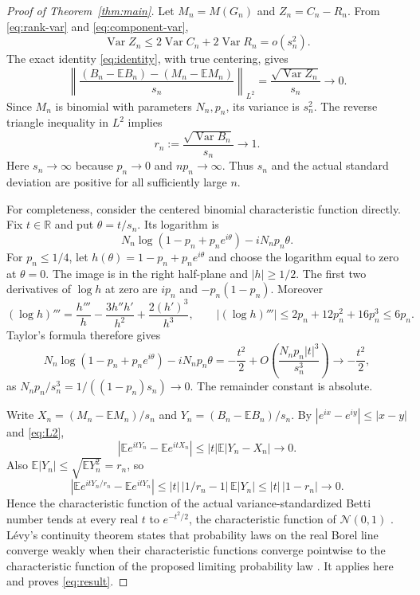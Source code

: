 \documentclass[11pt]{article}
\newcommand{\E}{\mathbb E}
\newcommand{\Var}{\operatorname{Var}}
\begin{document}
\begin{proof}[Proof of Theorem~\ref{thm:main}]
Let $M_n=M(G_n)$ and $Z_n=C_n-R_n$. From \eqref{eq:rank-var} and \eqref{eq:component-var},
\[
 \Var Z_n\le2\Var C_n+2\Var R_n=o(s_n^2).
\]
The exact identity \eqref{eq:identity}, with true centering, gives
\begin{equation}\label{eq:L2}
 \left\|\frac{(B_n-\E B_n)-(M_n-\E M_n)}{s_n}\right\|_{L^2}
 =\frac{\sqrt{\Var Z_n}}{s_n}\longrightarrow0.
\end{equation}
Since $M_n$ is binomial with parameters $N_n,p_n$, its variance is $s_n^2$. The reverse triangle inequality in $L^2$ implies
\begin{equation}\label{eq:variance-ratio}
 r_n:=\frac{\sqrt{\Var B_n}}{s_n}\longrightarrow1.
\end{equation}
Here $s_n\to\infty$ because $p_n\to0$ and $np_n\to\infty$. Thus $s_n$ and the actual standard deviation are positive for all sufficiently large $n$.

For completeness, consider the centered binomial characteristic function directly. Fix $t\in\mathbb R$ and put $\theta=t/s_n$. Its logarithm is
\[
 N_n\log(1-p_n+p_ne^{i\theta})-iN_np_n\theta.
\]
For $p_n\le1/4$, let $h(\theta)=1-p_n+p_ne^{i\theta}$ and choose the logarithm equal to zero at $\theta=0$. The image is in the right half-plane and $|h|\ge1/2$. The first two derivatives of $\log h$ at zero are $ip_n$ and $-p_n(1-p_n)$. Moreover
\[
 (\log h)'''=\frac{h'''}h-\frac{3h''h'}{h^2}+\frac{2(h')^3}{h^3},
 \qquad |(\log h)'''|\le2p_n+12p_n^2+16p_n^3\le6p_n.
\]
Taylor's formula therefore gives
\begin{equation}\label{eq:binomial-cf}
 N_n\log(1-p_n+p_ne^{i\theta})-iN_np_n\theta
 =-\frac{t^2}{2}+O\!\left(\frac{N_np_n|t|^3}{s_n^3}\right)
 \longrightarrow-\frac{t^2}{2},
\end{equation}
as $N_np_n/s_n^3=1/((1-p_n)s_n)\to0$. The remainder constant is absolute.

Write $X_n=(M_n-\E M_n)/s_n$ and $Y_n=(B_n-\E B_n)/s_n$. By $|e^{ix}-e^{iy}|\le|x-y|$ and \eqref{eq:L2},
\[
 |\E e^{itY_n}-\E e^{itX_n}|
 \le|t|\E|Y_n-X_n|\longrightarrow0.
\]
Also $\E|Y_n|\le\sqrt{\E Y_n^2}=r_n$, so
\[
 |\E e^{itY_n/r_n}-\E e^{itY_n}|
 \le|t|\,|1/r_n-1|\,\E|Y_n|
 \le|t|\,|1-r_n|\longrightarrow0.
\]
Hence the characteristic function of the actual variance-standardized Betti number tends at every real $t$ to $e^{-t^2/2}$, the characteristic function of $\mathcal N(0,1)$ \cite[Proposition 5.11.1]{chatterjee}. L\'evy's continuity theorem states that probability laws on the real Borel line converge weakly when their characteristic functions converge pointwise to the characteristic function of the proposed limiting probability law \cite[Theorem 1.1]{doebler}. It applies here and proves \eqref{eq:result}.
\end{proof}
\end{document}
